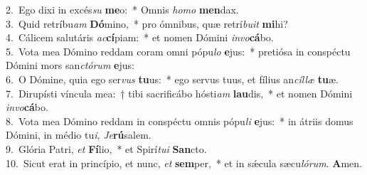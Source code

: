 {2.~}Ego dixi in excés\textit{su} \textbf{me}o:~* Omnis \textit{ho}\textit{mo} \textbf{men}dax.\\
{3.~}Quid retríbu\textit{am} \textbf{Dó}mino,~* pro ómnibus, quæ retrí\textit{bu}\textit{it} \textbf{mi}hi?\\
{4.~}Cálicem salutáris \textit{ac}\textbf{cí}piam:~* et nomen Dómini \textit{in}\textit{vo}\textbf{cá}bo.\\
{5.~}Vota mea Dómino reddam coram omni pópu\textit{lo} \textbf{e}jus:~* pretiósa in conspéctu Dómini mors san\textit{ctó}\textit{rum} \textbf{e}jus:\\
{6.~}O Dómine, quia ego ser\textit{vus} \textbf{tu}us:~* ego servus tuus, et fílius an\textit{cíl}\textit{læ} \textbf{tu}æ.\\
{7.~}Dirupísti víncula mea:~† tibi sacrificábo hósti\textit{am} \textbf{lau}dis,~* et nomen Dómini \textit{in}\textit{vo}\textbf{cá}bo.\\
{8.~}Vota mea Dómino reddam in conspéctu omnis pópu\textit{li} \textbf{e}jus:~* in átriis domus Dómini, in médio tu\textit{i}, \textit{Je}\textbf{rú}salem.\\
{9.~}Glória Patri, \textit{et} \textbf{Fí}lio,~* et Spirí\textit{tu}\textit{i} \textbf{San}cto.\\
{10.~}Sicut erat in princípio, et nunc, \textit{et} \textbf{sem}per,~* et in sǽcula sæcu\textit{ló}\textit{rum}. \textbf{A}men.\\
